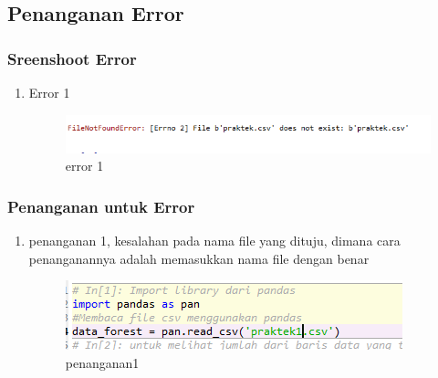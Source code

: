 \subsection{Penanganan Error}
\subsubsection{Sreenshoot Error}
\begin{enumerate}
\item Error 1
\begin{figure}[H]
\centering
\includegraphics[scale=1]{figures/1174051/4/12.PNG}
\caption{error 1}
\label{error 1}
\end{figure}        
\end{enumerate} 
\subsubsection{Penanganan untuk Error}
\begin{enumerate}
\item penanganan 1, kesalahan pada nama file yang dituju, dimana cara penanganannya adalah memasukkan nama file dengan benar
\begin{figure}[H]
\centering
\includegraphics[scale=1]{figures/1174051/4/13.PNG}
\caption{penanganan1}
\label{penanganan1}
\end{figure}
\end{enumerate}